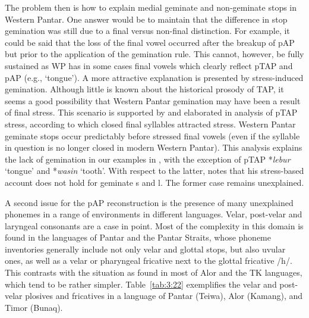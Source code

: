 The problem then is how to explain medial geminate and non-geminate stops in Western Pantar. One answer would be to maintain that the difference in stop gemination was still due to a final versus non-final distinction. For example, it could be said that the loss of the final vowel occurred after the breakup of pAP but prior to the application of the gemination rule. This cannot, however, be fully sustained as WP has in some cases final vowels which clearly reflect pTAP and pAP (e.g., `tongue'). A more attractive explanation is presented by stress-induced gemination. Although little is known about the historical prosody of TAP, it seems a good possibility that Western Pantar gemination may have been a result of final stress. 
This scenario is supported by and elaborated in  analysis of pTAP stress, according to which closed final syllables attracted stress. Western Pantar geminate stops occur predictably before stressed final vowels (even if the syllable in question is no longer closed in modern Western Pantar). This analysis explains the lack of gemination in our examples in , with the exception of pTAP *\textit{lebur} `tongue' and *\textit{wasin} `tooth'. With respect to the latter, \citet[288]{Heston2016} notes that his stress-based account does not hold for geminate s and l. The former case remains unexplained.

A second issue for the pAP reconstruction is the presence of many unexplained phonemes in a range of environments in different languages. Velar, post-velar and laryngeal consonants are a case in point. Most of the complexity in this domain is found in the languages of Pantar and the Pantar Straits, whose phoneme inventories generally include not only velar and glottal stops, but also uvular ones, as well as a velar or pharyngeal fricative next to the glottal fricative /h/. This contrasts with the situation as found in most of Alor and the TK languages, which tend to be rather simpler. Table~\ref{tab:3:22} exemplifies the velar and post-velar plosives and fricatives in a language of Pantar (Teiwa), Alor (Kamang), and Timor (Bunaq).



